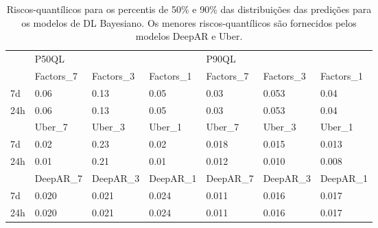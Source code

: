 \begin{center}
\begin{table}
  \begin{tabular}{l|l|l|l|l|l|l|}
    \cline{2-7}
    & \multicolumn{3}{l|}{P50QL}                       & \multicolumn{3}{l|}{P90QL}                       \\ \cline{2-7} 
    & Factors\_7 & Factors\_3 & Factors\_1 & Factors\_7 & Factors\_3 & Factors\_1 \\ \hline
    \multicolumn{1}{|l|}{7d}  & 0.06           & 0.13           & 0.05           & 0.03           & 0.053          & 0.04           \\ \hline
    \multicolumn{1}{|l|}{24h} & 0.06           & 0.13           & 0.05           & 0.03           & 0.053          & 0.04           \\ \hline
    & Uber\_7 & Uber\_3 & Uber\_1 & Uber\_7 & Uber\_3 & Uber\_1 \\ \hline
    \multicolumn{1}{|l|}{7d}  & 0.02    & 0.23    & 0.02    & 0.018    & 0.015   & 0.013    \\ \hline
    \multicolumn{1}{|l|}{24h} & 0.01    & 0.21    & 0.01    & 0.012   & 0.010   & 0.008    \\ \hline
    & DeepAR\_7 & DeepAR\_3 & DeepAR\_1 & DeepAR\_7 & DeepAR\_3 & DeepAR\_1 \\ \hline
    \multicolumn{1}{|l|}{7d}  & 0.020     & 0.021     & 0.024     & 0.011     & 0.016     & 0.017     \\ \hline
    \multicolumn{1}{|l|}{24h} &  0.020     & 0.021     & 0.024     & 0.011     & 0.016     & 0.017     \\ \hline
  \end{tabular}
  \caption{Riscos-quantílicos para os percentis de 50\% e 90\% das distribuições
    das predições para os modelos de DL Bayesiano. Os menores riscos-quantílicos
  são fornecidos pelos modelos DeepAR e Uber.}
  \label{tb:quants}
\end{table}
\end{center}

